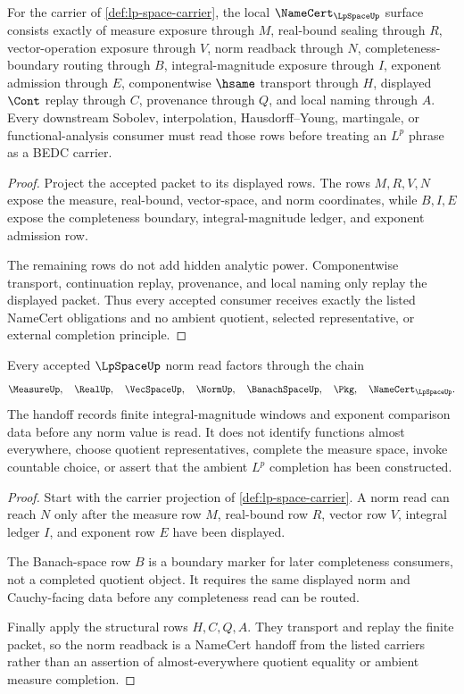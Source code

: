 \begin{theorem}
\label{thm:lp-space-namecert-obligations}
For the carrier of \autoref{def:lp-space-carrier}, the local $\NameCert_{\LpSpaceUp}$ surface consists exactly of measure exposure through $M$, real-bound sealing through $R$, vector-operation exposure through $V$, norm readback through $N$, completeness-boundary routing through $B$, integral-magnitude exposure through $I$, exponent admission through $E$, componentwise $\hsame$ transport through $H$, displayed $\Cont$ replay through $C$, provenance through $Q$, and local naming through $A$. Every downstream Sobolev, interpolation, Hausdorff--Young, martingale, or functional-analysis consumer must read those rows before treating an $L^p$ phrase as a BEDC carrier.
\end{theorem}
\begin{proof}
Project the accepted packet to its displayed rows. The rows $M,R,V,N$ expose the measure, real-bound, vector-space, and norm coordinates, while $B,I,E$ expose the completeness boundary, integral-magnitude ledger, and exponent admission row.

The remaining rows do not add hidden analytic power. Componentwise transport, continuation replay, provenance, and local naming only replay the displayed packet. Thus every accepted consumer receives exactly the listed NameCert obligations and no ambient quotient, selected representative, or external completion principle.
\end{proof}

\begin{theorem}
\label{thm:lp-space-norm-readback-handoff}
Every accepted $\LpSpaceUp$ norm read factors through the chain
$$
\MeasureUp,\quad \RealUp,\quad \VecSpaceUp,\quad \NormUp,\quad \BanachSpaceUp,\quad \Pkg,\quad \NameCert_{\LpSpaceUp}.
$$
The handoff records finite integral-magnitude windows and exponent comparison data before any norm value is read. It does not identify functions almost everywhere, choose quotient representatives, complete the measure space, invoke countable choice, or assert that the ambient $L^p$ completion has been constructed.
\end{theorem}
\begin{proof}
Start with the carrier projection of \autoref{def:lp-space-carrier}. A norm read can reach $N$ only after the measure row $M$, real-bound row $R$, vector row $V$, integral ledger $I$, and exponent row $E$ have been displayed.

The Banach-space row $B$ is a boundary marker for later completeness consumers, not a completed quotient object. It requires the same displayed norm and Cauchy-facing data before any completeness read can be routed.

Finally apply the structural rows $H,C,Q,A$. They transport and replay the finite packet, so the norm readback is a NameCert handoff from the listed carriers rather than an assertion of almost-everywhere quotient equality or ambient measure completion.
\end{proof}

